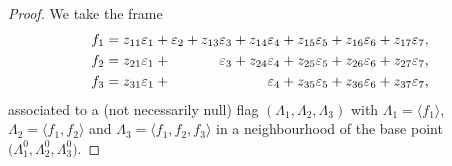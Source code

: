 \begin{proof}
We take the frame
\begin{align*}
f_1 & = z_{11}\varepsilon_1 + \varepsilon_2 + z_{13} \varepsilon_3 + z_{14} \varepsilon_4 + z_{15} \varepsilon_5 +
z_{16} \varepsilon_6 + z_{17} \varepsilon_7,
\\
f_2 & = z_{21}\varepsilon_1 + \hphantom{\varepsilon_2 + z_{13}} \varepsilon_3 + z_{24} \varepsilon_4 + z_{25} \varepsilon_5 + z_{26} \varepsilon_6 + z_{27} \varepsilon_7,
\\
f_3 & = z_{31}\varepsilon_1 + \hphantom{\varepsilon_2 + z_{13} \varepsilon_3 + z_{14}} \varepsilon_4 + z_{35} \varepsilon_5 +
z_{36} \varepsilon_6 + z_{37} \varepsilon_7,
\end{align*}
associated to a (not necessarily null) flag $(\Lambda_1, \Lambda_2, \Lambda_3)$
with $\Lambda_1 = \langle f_1\rangle$, $\Lambda_2 = \langle f_1, f_2\rangle$ and $\Lambda_3 = \langle f_1, f_2, f_3\rangle$ in a neighbourhood of the base point $\bigl(\Lambda_1^0, \Lambda_2^0, \Lambda_3^0\bigr)$.


\end{proof}

